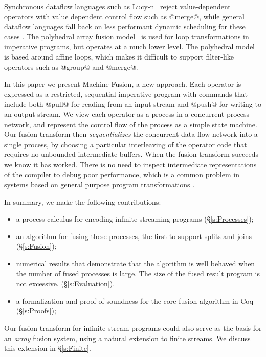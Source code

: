 Synchronous dataflow languages such as Lucy-n~\cite{mandel2010lucy} reject value-dependent operators with value dependent control flow such as @merge@, while general dataflow languages fall back on less performant dynamic scheduling for these cases \cite{bouakaz2013real}. The polyhedral array fusion model~\cite{feautrier2011polyhedron} is used for loop transformations in imperative programs, but operates at a much lower level. The polyhedral model is based around affine loops, which makes it difficult to support filter-like operators such as @group@ and @merge@.

In this paper we present Machine Fusion, a new approach. Each operator is expressed as a restricted, sequential imperative program with commands that include both @pull@ for reading from an input stream and @push@ for writing to an output stream. We view each operator as a process in a concurrent process network, and represent the control flow of the process as a simple state machine. Our fusion transform then \emph{sequentializes} the concurrent data flow network into a single process, by choosing a particular interleaving of the operator code that requires no unbounded intermediate buffers. When the fusion transform succeeds we know it has worked. There is no need to inspect intermediate representations of the compiler to debug poor performance, which is a common problem in systems based on general purpose program transformations \cite{lippmeier2012:guiding}.

In summary, we make the following contributions:
\begin{itemize}
\item a process calculus for encoding infinite streaming programs (\S\ref{s:Processes});
\item an algorithm for fusing these processes, the first to support splits and joins (\S\ref{s:Fusion});
\item numerical results that demonstrate that the algorithm is well behaved when the number of fused processes is large. The size of the fused result program is not excessive. (\S\ref{s:Evaluation}).
\item a formalization and proof of soundness for the core fusion algorithm in Coq (\S\ref{s:Proofs});
\end{itemize}

Our fusion transform for infinite stream programs could also serve as the basis for an \emph{array} fusion system, using a natural extension to finite streams. We discuss this extension in \S\ref{s:Finite}.

